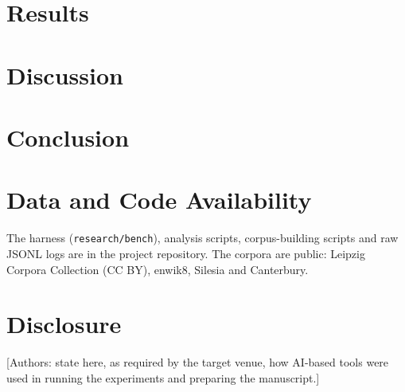 \documentclass[conference]{IEEEtran}
\begin{document}
\section{Results}


\section{Discussion}


\section{Conclusion}


\section*{Data and Code Availability}
The harness (\texttt{research/bench}), analysis scripts, corpus-building scripts and raw JSONL logs are in the project repository. The corpora are public: Leipzig Corpora Collection (CC BY), enwik8, Silesia and Canterbury.

\section*{Disclosure}
[Authors: state here, as required by the target venue, how AI-based tools were used in running the experiments and preparing the manuscript.]



\end{document}
